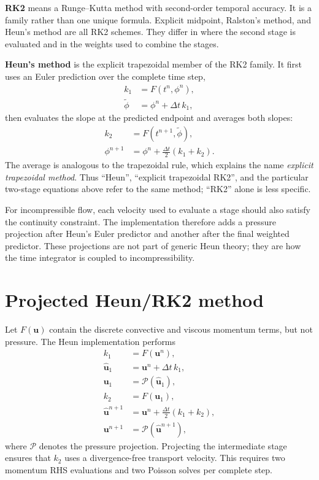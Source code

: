\documentclass[11pt,a4paper]{article}
\begin{document}
\textbf{RK2} means a Runge--Kutta method with second-order temporal accuracy.
It is a family rather than one unique formula. Explicit midpoint, Ralston's
method, and Heun's method are all RK2 schemes. They differ in where the second
stage is evaluated and in the weights used to combine the stages.

\textbf{Heun's method} is the explicit trapezoidal member of the RK2 family.
It first uses an Euler prediction over the complete time step,
\begin{align}
 k_1 &= F(t^n,\phi^n),\\
 \widetilde{\phi} &= \phi^n+\Delta t\,k_1,
\end{align}
then evaluates the slope at the predicted endpoint and averages both slopes:
\begin{align}
 k_2 &= F(t^{n+1},\widetilde{\phi}),\\
 \phi^{n+1} &= \phi^n+\frac{\Delta t}{2}(k_1+k_2).
\end{align}
The average is analogous to the trapezoidal rule, which explains the name
\emph{explicit trapezoidal method}. Thus ``Heun'', ``explicit trapezoidal
RK2'', and the particular two-stage equations above refer to the same method;
``RK2'' alone is less specific.

For incompressible flow, each velocity used to evaluate a stage should also
satisfy the continuity constraint. The implementation therefore adds a
pressure projection after Heun's Euler predictor and another after the final
weighted predictor. These projections are not part of generic Heun theory;
they are how the time integrator is coupled to incompressibility.

\section{Projected Heun/RK2 method}

Let $F(\bm{u})$ contain the discrete convective and viscous momentum terms,
but not pressure. The Heun implementation performs
\begin{align}
 k_1 &= F(\bm{u}^{n}),\\
 \widehat{\bm{u}}_1 &= \bm{u}^{n}+\Delta t\,k_1,\\
 \bm{u}_1 &= \mathcal{P}(\widehat{\bm{u}}_1),\\
 k_2 &= F(\bm{u}_1),\\
 \widehat{\bm{u}}^{n+1}
 &=\bm{u}^{n}+\frac{\Delta t}{2}(k_1+k_2),\\
 \bm{u}^{n+1}&=\mathcal{P}(\widehat{\bm{u}}^{n+1}),
\end{align}
where $\mathcal{P}$ denotes the pressure projection. Projecting the
intermediate stage ensures that $k_2$ uses a divergence-free transport
velocity. This requires two momentum RHS evaluations and two Poisson solves
per complete step.
\end{document}
